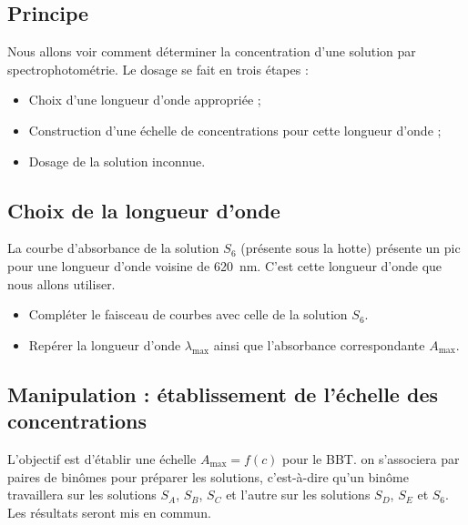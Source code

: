 \documentclass{tp}
\begin{document}
\subsection{Principe}%
\label{sub:principe_dosage}

Nous allons voir comment déterminer la concentration d'une solution par spectrophotométrie. Le dosage se fait en trois étapes :
\begin{itemize}
  \item Choix d'une longueur d'onde appropriée ;
  \item Construction d'une échelle de concentrations pour cette longueur d'onde ;
  \item Dosage de la solution inconnue.
\end{itemize}

\subsection{Choix de la longueur d'onde}%
\label{sub:choix_de_la_longueur_d_onde}

La courbe d'absorbance de la solution $S_6$ (présente sous la hotte) présente un pic pour une longueur d'onde voisine de \SI{620}{\nano\meter}. C'est cette longueur d'onde que nous allons utiliser.

\begin{itemize}
  \item Compléter le faisceau de courbes avec celle de la solution $S_6$. 
  \item Repérer la longueur d'onde $\lambda_\text{max}$ ainsi que l'absorbance correspondante $A_\text{max}$. 
\end{itemize}

\subsection{Manipulation : établissement de l'échelle des concentrations}%
\label{sub:manipulation_etablissement_de_l_echelle_des_concentrations}

L'objectif est d'établir une échelle $A_\text{max}=f(c)$ pour le BBT. on s'associera par paires de binômes pour préparer les solutions, c'est-à-dire qu'un binôme travaillera sur les solutions $S_A$, $S_B$, $S_C$ et l'autre sur les solutions $S_D$, $S_E$ et $S_6$. Les résultats seront mis en commun.
\end{document}
